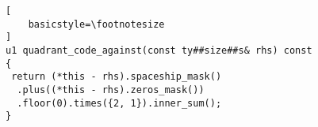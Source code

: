 \begin{lstlisting}[
    basicstyle=\footnotesize
]
u1 quadrant_code_against(const ty##size##s& rhs) const 
{
 return (*this - rhs).spaceship_mask()
  .plus((*this - rhs).zeros_mask())
  .floor(0).times({2, 1}).inner_sum(); 
}
\end{lstlisting}%
